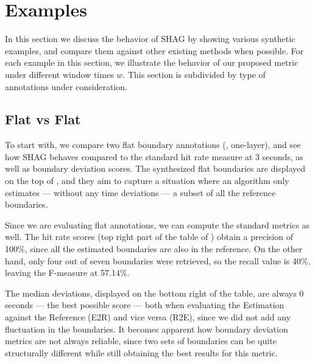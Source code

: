 \documentclass{article}
\begin{document}
\section{Examples}\label{sec:examples}

In this section we discuss the behavior of SHAG by showing various synthetic examples, and compare them against other existing methods when possible.
For each example in this section, we illustrate the behavior of our proposed metric
under different window times $w$.
This section is subdivided by type of annotations under consideration.

\subsection{Flat vs Flat}

To start with, we compare two flat boundary annotations (\ie, one-layer), and see how SHAG behaves compared to the standard hit rate measure at 3 seconds, as well as boundary deviation
scores.
The synthesized flat boundaries are displayed on the top of , and they aim to capture a situation where an algorithm only estimates --- without any time deviations
--- a subset of all the reference boundaries.

Since we are evaluating flat annotations, we can compute the standard metrics as well. The hit rate scores (top right part of the table of ) obtain a precision of 100\%, since all the estimated boundaries are also in the reference.
On the other hand, only four out of seven boundaries were retrieved, so the recall value is 40\%, leaving the F-measure at 57.14\%.

The median deviations, displayed on the bottom right of the table, are always 0 seconds --- the best possible score --- both when evaluating the Estimation against the Reference (E2R) and vice versa (R2E), since we did not add any fluctuation in the boundaries.
It becomes apparent how boundary deviation metrics are not always reliable, since two sets of boundaries can be quite structurally different while still obtaining the best results for this metric.
\end{document}

